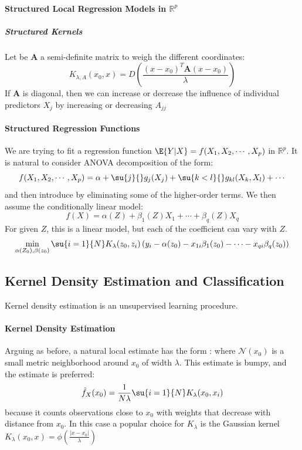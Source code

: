 \paragraph{Structured Local Regression Models in $\mathbb{R}^{p}$}
\subparagraph{Structured Kernels}
Let be $\bm{A}$ a semi-definite matrix to weigh the different coordinates:
$$ K_{\lambda,A}(x_{0},x)=D\left(\dfrac{(x-x_{0})^{T}\bm{A}(x-x_{0})}{\lambda}\right)$$
If $\bm{A}$ is diagonal, then we can increase or decrease the influence of individual predictors
$X_{j}$ by increasing or decreasing $A_{jj}$

\paragraph{Structured Regression Functions}
We are trying to fit a regression function $\E{Y|X}= f(X_{1}, X_{2},\cdots, X_{p})$ in 
$\mathbb{R}^{p}$. It is natural to consider ANOVA decomposition of the form:
$$ f(X_{1}, X_{2}, \cdots, X_{p}) = \alpha+\su{{j}}{}g_{j}(X_{j})+\su{{k<l}}{}g_{kl}(X_{k},X_{l})
+\cdots$$
and then introduce by eliminating some of the higher-order terms. We then assume the conditionally
linear model:
$$ f(X)=\alpha(Z)+\beta_{1}(Z)X_{1}+\cdots+\beta_{q}(Z)X_{q}$$
For given $Z$, this is a linear model, but each of the  coefficient can vary with $Z$.
$$\min\limits_{\alpha(Z_{0}),\beta(z_{0})}\su{{i=1}}{N}K_{\lambda}(z_{0}, z_{i})\left(y_{i}-
\alpha(z_{0})-x_{1i}\beta_{1}(z_{0})-\cdots-x_{qi}\beta_{q}(z_{0})\right)$$

\subsection{Kernel Density Estimation and Classification}
Kernel density estimation is an unsupervised learning procedure.
\paragraph{Kernel Density Estimation}
Arguing as before, a natural local estimate has the form :  where $\mathcal{N}(x_{0})$ is a small metric neighborhood around
$x_{0}$ of width $\lambda$. This estimate is bumpy, and the  estimate is 
preferred:
$$ \hat{f}_{X}(x_{0}) = \dfrac{1}{N\lambda}\su{{i=1}}{N}K_{\lambda}(x_{0}, x_{i})$$
because it counts observations close to $x_{0}$ with weights that decrease with distance from
$x_{0}$. In this case a popular choice for $K_{\lambda}$ is the Gaussian kernel $K_{\lambda}(
x_{0},x)=\phi\left(\frac{|x-x_{0}|}{\lambda}\right)$

